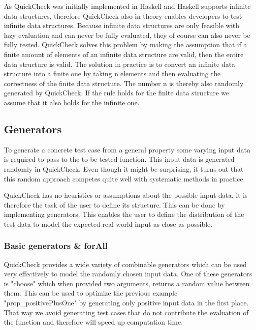 \documentclass[a4paper, 12pt]{article} %
\begin{document}
As QuickCheck was initially implemented in Haskell and Haskell supports infinite data structures, therefore QuickCheck also in theory enables developers to test infinite data structures. Because infinite data structures are only feasible with lazy evaluation and can never be fully evaluated, they of course can also never be fully tested. QuickCheck solves this problem by making the assumption that if a finite amount of elements of an infinite data structure are valid, then the entire data structure is valid. The solution in practice is to convert an infinite data structure into a finite one by taking n elements and then evaluating the correctness of the finite data structure. The number n is thereby also randomly generated by QuickCheck. If the rule holds for the finite data structure we assume that it also holds for the infinite one\cite{Claessen2000}.

\subsection{Generators}

To generate a concrete test case from a general property some varying input data is required to pass to the to be tested function. This input data is generated randomly in QuickCheck. Even though it might be surprising, it turns out that this random approach competes quite well with systematic methods in practice\cite{Claessen2000}.

QuickCheck has no heuristics or assumptions about the possible input data, it is therefore the task of the user to define its structure. This can be done by implementing generators. This enables the user to define the distribution of the test data to model the expected real world input as close as possible.


\subsubsection{Basic generators \& forAll}

QuickCheck provides a wide variety of combinable generators which can be used very effectively to model the randomly chosen input data. One of these generators is "choose" which when provided two arguments, returns a random value between them. This can be used to optimize the previous example "prop\_positivePlusOne" by generating only positive input data in the first place. That way we avoid generating test cases that do not contribute the evaluation of the function and therefore will speed up computation time. 
\end{document}
